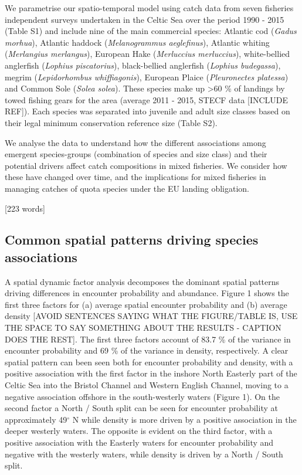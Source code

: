 \documentclass{nature}
\begin{document}
\begin{linenumbers}
We parametrise our spatio-temporal model using catch data from seven fisheries
independent surveys undertaken in the Celtic Sea over the period 1990 - 2015
(Table S1) and include nine of the main commercial species: Atlantic cod
(\textit{Gadus morhua}), Atlantic haddock (\textit{Melanogrammus aeglefinus}),
Atlantic whiting (\textit{Merlangius merlangus}), European Hake
(\textit{Merluccius merluccius}), white-bellied anglerfish (\textit{Lophius
	piscatorius}), black-bellied anglerfish (\textit{Lophius budegassa}),
megrim (\textit{Lepidorhombus whiffiagonis}), European Plaice
(\textit{Pleuronectes platessa}) and Common Sole (\textit{Solea solea}). These
species make up \textgreater 60 \% of landings by towed fishing gears for the
area (average 2011 - 2015, STECF data [INCLUDE REF]). Each species was separated into
juvenile and adult size classes based on their legal minimum conservation
reference size (Table S2).

We analyse the data to understand how the different associations among emergent
species-groups (combination of species and size class) and their potential
drivers affect catch compositions in mixed fisheries. We consider how these
have changed over time, and the implications for mixed fisheries in managing
catches of quota species under the EU landing obligation.

[223 words]

\subsection{Common spatial patterns driving species associations} A spatial
dynamic factor analysis decomposes the dominant spatial patterns driving
differences in encounter probability and abundance. Figure 1 shows the first
three factors for (a) average spatial encounter probability and (b) average
density [AVOID SENTENCES SAYING WHAT THE FIGURE/TABLE IS, USE THE SPACE TO SAY SOMETHING ABOUT THE RESULTS - CAPTION DOES THE REST]. The first three factors account of 83.7 \% of the variance in
encounter probability and 69 \% of the variance in density, respectively. A
clear spatial pattern can been seen both for encounter probability and density,
with a positive association with the first factor in the inshore North Easterly
part of the Celtic Sea into the Bristol Channel and Western English Channel,
moving to a negative association offshore in the south-westerly waters (Figure 1). On the
second factor a North / South split can be seen for encounter probability at
approximately 49$^{\circ}$ N while density is more driven by a positive
association in the deeper westerly waters.  The opposite is evident on the
third factor, with a positive association with the Easterly waters for
encounter probability and negative with the westerly waters, while density is
driven by a North / South split.


\end{linenumbers}
\end{document}
